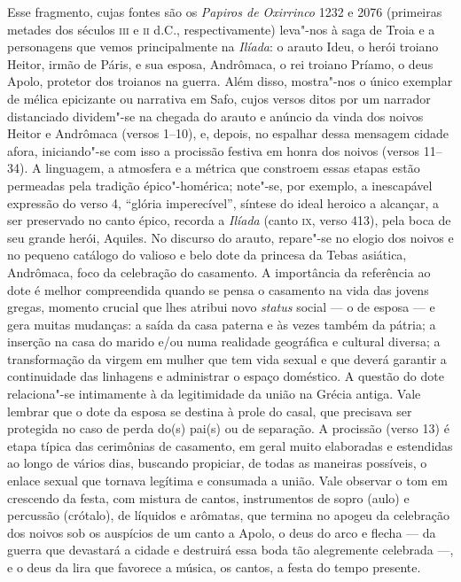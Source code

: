 {\small Esse fragmento, cujas fontes são os \textit{Papiros de Oxirrinco} 1232 e 2076
(primeiras metades dos séculos \textsc{iii} e \textsc{ii} d.C., respectivamente) leva"-nos à saga
de Troia e a personagens que vemos principalmente na \textit{Ilíada}: o arauto
Ideu, o herói troiano Heitor, irmão de Páris, e sua esposa, Andrômaca, o rei
troiano Príamo, o deus Apolo, protetor dos troianos na guerra. Além disso,
mostra"-nos o único exemplar de mélica
epicizante ou narrativa em Safo, cujos versos ditos por um narrador distanciado dividem"-se na
chegada do arauto e anúncio da vinda dos noivos Heitor e Andrômaca (versos
1--10), e, depois, no espalhar dessa mensagem cidade afora, iniciando"-se com
isso a procissão festiva em honra dos noivos (versos 11--34). A linguagem, a
atmosfera e a métrica que constroem essas etapas estão permeadas pela tradição
épico"-homérica; note"-se, por exemplo, a inescapável expressão do verso 4,
``glória imperecível”, síntese do ideal heroico a alcançar, a
ser preservado no canto épico, recorda a \textit{Ilíada }(canto \textsc{ix}, verso 413),
pela boca de seu grande herói, Aquiles. No discurso do arauto, repare"-se no
elogio dos noivos e no pequeno catálogo do valioso e belo dote da princesa da
Tebas asiática, Andrômaca, foco da celebração do casamento. A importância da
referência ao dote é melhor
compreendida quando se pensa o casamento na vida das jovens gregas, momento
crucial que lhes atribui novo \textit{status} social --- o de esposa --- e gera
muitas mudanças: a saída da casa paterna e às vezes também da pátria; a
inserção na casa do marido e/ou numa realidade geográfica e cultural diversa; a
transformação da virgem em mulher que tem vida sexual e que deverá garantir a
continuidade das linhagens e administrar o espaço doméstico. A questão do dote
relaciona"-se intimamente à da legitimidade da união na Grécia antiga. Vale
lembrar que o dote da esposa se destina à prole do casal, que precisava ser
protegida no caso de perda do(s) pai(s) ou de separação. A procissão (verso
13) é etapa típica das cerimônias de casamento, em geral muito elaboradas e
estendidas ao longo de vários dias, buscando propiciar, de todas as maneiras
possíveis, o enlace sexual que tornava legítima e consumada a união.
Vale observar o tom em crescendo da festa, com mistura de cantos, instrumentos de sopro (aulo) e percussão (crótalo), de líquidos e arômatas, que termina no apogeu da celebração dos noivos sob os auspícios de um canto a Apolo, o deus do arco e flecha --- da guerra que devastará a cidade e destruirá essa boda tão alegremente celebrada ---, e o deus da lira que favorece a música, os cantos, a festa do tempo presente. 
}
